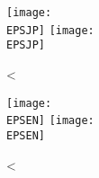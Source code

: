 \documentclass[a4paper,uplatex]{article}
\def\EPSJP{filename_jp.pdf}
\def\EPSEN{filename_en.pdf}
\def\VSEP{\vspace{-1.5pt}}
\def\HSEP{\hspace{-0.5pt}}
\begin{document}
\parindent 0pt
\newcount\nrepmax {}\relax
\newcount\nrep {}\relax
\newcount\inc {}\relax
\vspace*{2mm}%
\loop%
\noindent%
\begin{minipage}{196mm}%
\hspace{14mm}%
\texttt{[image: \\EPSJP]}%
\HSEP%
\texttt{[image: \\EPSJP]}%
\end{minipage}\par%
\VSEP%
\advance\nrep\inc\relax\ifnum\nrep<\nrepmax\relax%
\repeat%
\newpage
\parindent 0pt
\newcount\nrepmax {}\relax
\newcount\nrep {}\relax
\newcount\inc {}\relax
\vspace*{2mm}%
\loop%
\noindent%
\begin{minipage}{196mm}%
\hspace{14mm}%
\texttt{[image: \\EPSEN]}%
\HSEP%
\texttt{[image: \\EPSEN]}%
\end{minipage}\par%
\VSEP%
\advance\nrep\inc\relax\ifnum\nrep<\nrepmax\relax%
\repeat%
\end{document}
